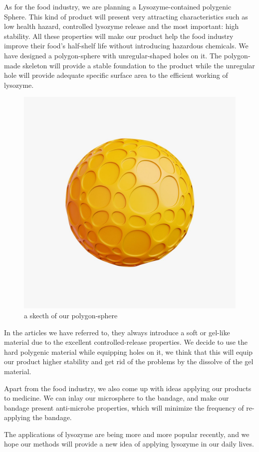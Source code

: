 As for the food industry, we are planning a Lysozyme-contained polygenic Sphere. This kind of product will present very attracting characteristics such as low health hazard, controlled lysozyme release and the most important: high stability. All these properties will make our product help the food industry improve their food’s half-shelf life without introducing hazardous chemicals. We have designed a polygon-sphere with unregular-shaped holes on it. The polygon-made skeleton will provide a stable foundation to the product while the unregular hole will provide adequate specific surface area to the efficient working of lysozyme.

\begin{figure}[!h]
	\centering
	\includegraphics[width=0.7\linewidth]{figures/chp2_innovation}
	\caption{a skecth of our polygon-sphere}
	\label{fig:chp2innovation}
\end{figure}


In the articles we have referred to, they always introduce a soft or gel-like material due to the excellent controlled-release properties. We decide to use the hard polygenic material while equipping holes on it, we think that this will equip our product higher stability and get rid of the problems by the dissolve of the gel material. 

Apart from the food industry, we also come up with ideas applying our products to medicine. We can inlay our microsphere to the bandage, and make our bandage present anti-microbe properties, which will minimize the frequency of re-applying the bandage.

The applications of lysozyme are being more and more popular recently, and we hope our methods will provide a new idea of applying lysozyme in our daily lives. 

